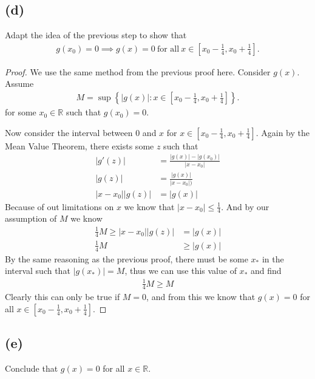 \documentclass[12pt]{amsart}
\newcommand{\R}{\mathbb{R}}
\begin{document}
\subsection*{(d)}%
\label{sub:_d_}

Adapt the idea of the previous step to show that
\begin{align*}
  g(x_0)=0\implies g(x)=0\ \text{for all}\ x\in\left[x_0-\frac{1}{4},
  x_0+\frac{1}{4}\right].
\end{align*}

\begin{proof}
  We use the same method from the previous proof here. Consider $g(x)$. Assume
  \begin{align*}
    M=\sup\left\{|g(x)|:x\in\left[x_0-\frac{1}{4},x_0+\frac{1}{4}\right]\right\}.
  \end{align*}
  for some $x_0\in\R$ such that $g(x_0)=0$.

  Now consider the interval between $0$ and $x$ for
  $x\in[x_0-\frac{1}{4},x_0+\frac{1}{4}]$. Again by the Mean Value Theorem,
  there exists some $z$ such that
  \begin{align*}
    |g'(z)|&=\frac{|g(x)|-|g(x_0)|}{|x-x_0|}\\
    |g(z)|&=\frac{|g(x)|}{|x-x_0|)}\\
    |x-x_0||g(z)|&=|g(x)|
  \end{align*}
  Because of out limitations on $x$ we know that $|x-x_0|\leq\frac{1}{4}$. And
  by our assumption of $M$ we know
  \begin{align*}
    \frac{1}{4}M\geq|x-x_0||g(z)|&=|g(x)|\\
    \frac{1}{4}M&\geq|g(x)|
  \end{align*}
  By the same reasoning as the previous proof, there must be some $x_*$ in the
  interval such that $|g(x_*)|=M$, thus we can use this value of $x_*$ and find
  \begin{align*}
    \frac{1}{4}M\geq M
  \end{align*}
  Clearly this can only be true if $M=0$, and from this we know that $g(x)=0$
  for all $x\in\left[x_0-\frac{1}{4},x_0+\frac{1}{4}\right]$.
\end{proof}

\subsection*{(e)}%
\label{sub:_e_}

Conclude that $g(x)=0$ for all $x\in\R$.
\end{document}

